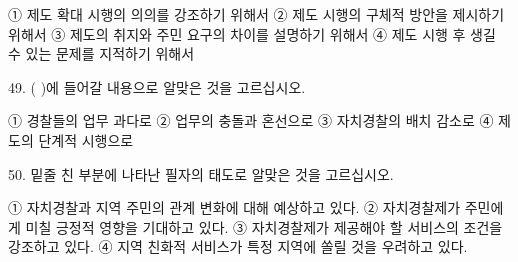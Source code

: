 \documentclass[12pt]{article}
\begin{document}
\begin{enumerate}[1.]
① 제도 확대 시행의 의의를 강조하기 위해서
② 제도 시행의 구체적 방안을 제시하기 위해서
③ 제도의 취지와 주민 요구의 차이를 설명하기 위해서
④ 제도 시행 후 생길 수 있는 문제를 지적하기 위해서


49. (    )에 들어갈 내용으로 알맞은 것을 고르십시오.

① 경찰들의 업무 과다로	② 업무의 충돌과 혼선으로
③ 자치경찰의 배치 감소로	④ 제도의 단계적 시행으로


50. 밑줄 친 부분에 나타난 필자의 태도로 알맞은 것을 고르십시오.

① 자치경찰과 지역 주민의 관계 변화에 대해 예상하고 있다.
② 자치경찰제가 주민에게 미칠 긍정적 영향을 기대하고 있다.
③ 자치경찰제가 제공해야 할 서비스의 조건을 강조하고 있다.
④ 지역 친화적 서비스가 특정 지역에 쏠릴 것을 우려하고 있다.
    \end{enumerate}
\end{document}
